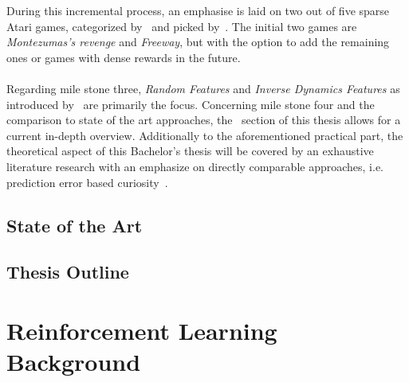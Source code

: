 \documentclass[draft,final]{vutinfth} %
\begin{document}
    During this incremental process, an emphasise is laid on two out of five sparse Atari games, categorized by~\cite{bellemare_unifying_2016} and picked by~\citeauthor{burda_large-scale_2018-1}.
    The initial two games are \textit{Montezumas's revenge} and \textit{Freeway}, but with the option to add the remaining ones or games with dense rewards in the future.
    \\\\
    Regarding mile stone three, \textit{Random Features} and \textit{Inverse Dynamics Features} as introduced by~\citeauthor{burda_large-scale_2018-1} are primarily the focus.
    Concerning mile stone four and the comparison to state of the art approaches, the~ section of this thesis allows for a current in-depth overview.
    Additionally to the aforementioned practical part, the theoretical aspect of this Bachelor's thesis will be covered by an exhaustive literature research with an emphasize on directly comparable approaches, i.e. prediction error based curiosity~\citep{burda_large-scale_2018-1}.


    \section{State of the Art}\label{sec:state-of-the-art}


    \section{Thesis Outline}\label{sec:thesis-outline}


    \chapter{Reinforcement Learning Background}\label{ch:reinforcement-learning-background}

\end{document}

